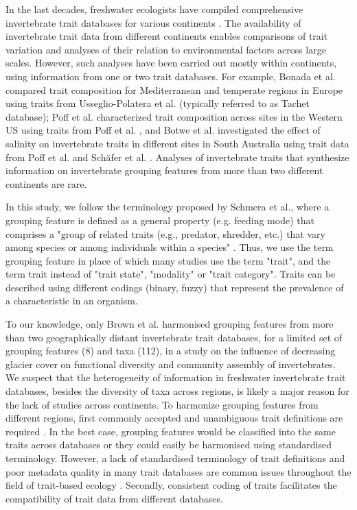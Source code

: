 \documentclass{article}
\begin{document}
In the last decades, freshwater ecologists have compiled comprehensive invertebrate trait databases for various continents \cite{usseglio-polatera_biomonitoring_2000, schmidt-kloiber_www.freshwaterecology.info_2015, vieira_database_nodate, Philips_and_Smith_NZ_DB_2018, kefford_integrated_2020, tomanova_trophic_2006}. The availability of invertebrate trait data from different continents enables comparisons of trait variation and analyses of their relation to environmental factors across large scales. However, such analyses have been carried out mostly within continents, using information from one or two trait databases. For example, Bonada et al. \cite{bonada_taxonomic_2007} compared trait composition for Mediterranean and temperate regions in Europe using traits from Usseglio-Polatera et al. \cite{usseglio-polatera_biomonitoring_2000}(typically referred to as Tachet database); Poff et al. \cite{poff_developing_2010} characterized trait composition across sites in the Western US using traits from Poff et al. \cite{poff_functional_2006}, and Botwe et al. \cite{botwe_effects_2018} investigated the effect of salinity on invertebrate traits in different sites in South Australia using trait data from Poff et al. \cite{poff_functional_2006} and Schäfer et al. \cite{schafer_trait_2011}. Analyses of invertebrate traits that synthesize information on invertebrate grouping features from more than two different continents are rare. 

In this study, we follow the terminology proposed by Schmera et al., where a grouping feature is defined as a general property (e.g. feeding mode) that comprises a "group of related traits (e.g., predator, shredder, etc.) that vary among species or among individuals within a species" \cite{schmera_proposed_2015}. Thus, we use the term grouping feature in place of which many studies use the term "trait", and the term trait instead of "trait state", "modality" or "trait category". Traits can be described using different codings (binary, fuzzy) that represent the prevalence of a characteristic in an organism.

To our knowledge, only Brown et al. \cite{brown_functional_2018} harmonised grouping features from more than two geographically distant invertebrate trait databases, for a limited set of grouping features (8) and taxa (112), in a study on the influence of decreasing glacier cover on functional diversity and community assembly of invertebrates. We suspect that the heterogeneity of information in freshwater invertebrate trait databases, besides the diversity of taxa across regions, is likely a major reason for the lack of studies across continents. To harmonize grouping features from different regions, first commonly accepted and unambiguous trait definitions are required \cite{schneider_towards_2019}. In the best case, grouping features would be classified into the same traits across databases or they could easily be harmonised using standardised terminology. However, a lack of standardised terminology of trait definitions and poor metadata quality in many trait databases are common issues throughout the field of trait-based ecology \cite{baird_toward_2011, kissling_towards_2018}. Secondly, consistent coding of traits facilitates the compatibility of trait data from different databases. 
\end{document}
